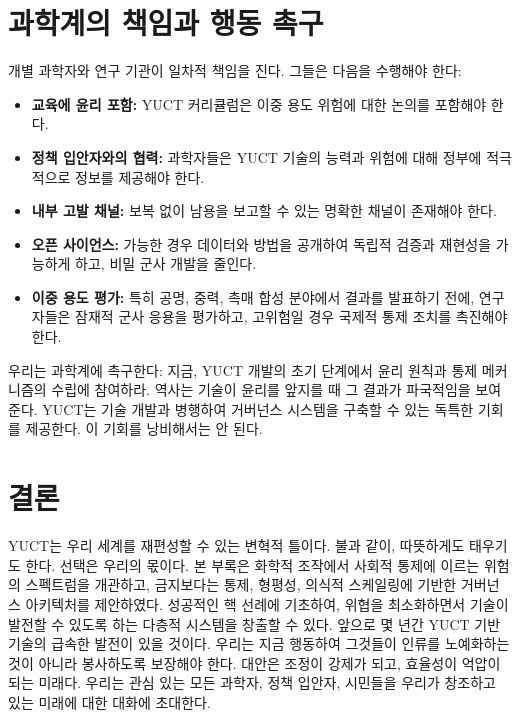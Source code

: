 \documentclass[12pt,a4paper]{article}
\theoremstyle{remark}
\begin{document}
	\section{과학계의 책임과 행동 촉구}
	\label{sec:scientists}
	
	개별 과학자와 연구 기관이 일차적 책임을 진다. 그들은 다음을 수행해야 한다:
	\begin{itemize}[leftmargin=*]
		\item \textbf{교육에 윤리 포함:} YUCT 커리큘럼은 이중 용도 위험에 대한 논의를 포함해야 한다.
		\item \textbf{정책 입안자와의 협력:} 과학자들은 YUCT 기술의 능력과 위험에 대해 정부에 적극적으로 정보를 제공해야 한다.
		\item \textbf{내부 고발 채널:} 보복 없이 남용을 보고할 수 있는 명확한 채널이 존재해야 한다.
		\item \textbf{오픈 사이언스:} 가능한 경우 데이터와 방법을 공개하여 독립적 검증과 재현성을 가능하게 하고, 비밀 군사 개발을 줄인다.
		\item \textbf{이중 용도 평가:} 특히 공명, 중력, 촉매 합성 분야에서 결과를 발표하기 전에, 연구자들은 잠재적 군사 응용을 평가하고, 고위험일 경우 국제적 통제 조치를 촉진해야 한다.
	\end{itemize}
	
	우리는 과학계에 촉구한다: 지금, YUCT 개발의 초기 단계에서 윤리 원칙과 통제 메커니즘의 수립에 참여하라. 역사는 기술이 윤리를 앞지를 때 그 결과가 파국적임을 보여준다. YUCT는 기술 개발과 병행하여 거버넌스 시스템을 구축할 수 있는 독특한 기회를 제공한다. 이 기회를 낭비해서는 안 된다.
	
	\section{결론}
	\label{sec:conclusion}
	
	YUCT는 우리 세계를 재편성할 수 있는 변혁적 틀이다. 불과 같이, 따뜻하게도 태우기도 한다. 선택은 우리의 몫이다. 본 부록은 화학적 조작에서 사회적 통제에 이르는 위험의 스펙트럼을 개관하고, 금지보다는 통제, 형평성, 의식적 스케일링에 기반한 거버넌스 아키텍처를 제안하였다. 성공적인 핵 선례에 기초하여, 위협을 최소화하면서 기술이 발전할 수 있도록 하는 다층적 시스템을 창출할 수 있다. 앞으로 몇 년간 YUCT 기반 기술의 급속한 발전이 있을 것이다. 우리는 지금 행동하여 그것들이 인류를 노예화하는 것이 아니라 봉사하도록 보장해야 한다. 대안은 조정이 강제가 되고, 효율성이 억압이 되는 미래다. 우리는 관심 있는 모든 과학자, 정책 입안자, 시민들을 우리가 창조하고 있는 미래에 대한 대화에 초대한다.
	
\end{document}
